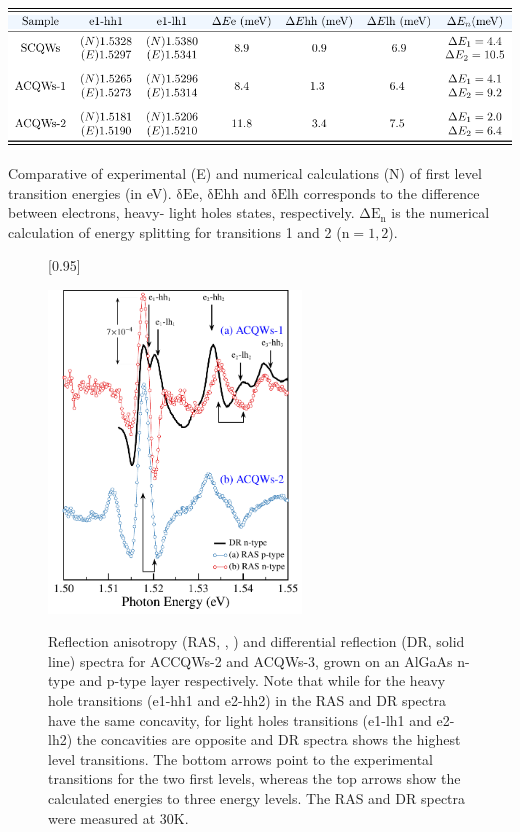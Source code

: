 \begin{table}[t]
	\centering
	\includegraphics[width=\textwidth]{../tables/chapter-3/table-ras/out/table-ras.pdf}
	\caption{Comparative of experimental (E) and numerical calculations (N) of first level transition  energies (in eV). $\mathrm{\delta Ee}$, $\mathrm{\delta Ehh}$ and $\mathrm{\delta Elh}$ corresponds to the difference between electrons, heavy- light holes states, respectively. $\mathrm{\Delta E_n}$ is the numerical calculation of energy splitting for transitions 1 and 2 ($ \mathrm{n}=1,2$).}
	\label{tab:sec-chapter-3-ras-table} 
\end{table}
\begin{figure}[h]
	[0.95\FBwidth]
	{\caption{Reflection anisotropy (RAS, ,  ) and differential reflection (DR, solid line) spectra for ACCQWs-2 and ACQWs-3,  grown on an AlGaAs n-type  and  p-type layer respectively. Note that while for the heavy hole transitions (e1-hh1 and e2-hh2) in the RAS and DR spectra have the same concavity, for light holes transitions (e1-lh1 and e2-lh2) the concavities are opposite and DR spectra shows the highest level transitions. The bottom arrows point to the experimental transitions for the two first levels, whereas the top arrows show the calculated energies to three energy levels.  The RAS and DR spectra were measured at 30K.}\label{fig:chapter-3-subsec-ras-plots-set-4}}
	{
	\includegraphics[width=0.6\textwidth]{../figures/chapter-3/ras-plots/out/ras-set-4.pdf}
	\label{subfig:chapter-3-subsubsec-ras-strength-set-4-a}
	\label{subfig:chapter-3-subsubsec-ras-strength-set-4-b}
	}
\end{figure}

